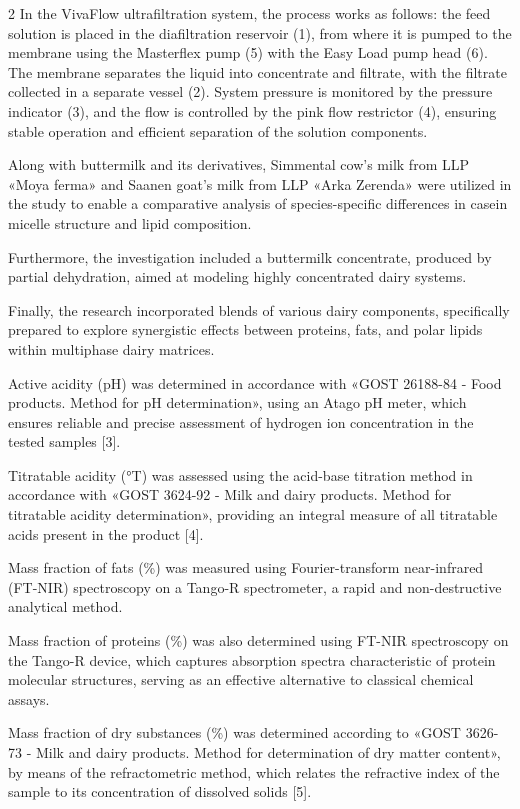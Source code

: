 \begin{multicols}{2}
In the VivaFlow ultrafiltration system, the process works as follows:
the feed solution is placed in the diafiltration reservoir (1), from
where it is pumped to the membrane using the Masterflex pump (5) with
the Easy Load pump head (6). The membrane separates the liquid into
concentrate and filtrate, with the filtrate collected in a separate
vessel (2). System pressure is monitored by the pressure indicator (3),
and the flow is controlled by the pink flow restrictor (4), ensuring
stable operation and efficient separation of the solution components.

Along with buttermilk and its derivatives, Simmental cow's milk from LLP
«Moya ferma» and Saanen goat's milk from LLP «Arka Zerenda» were
utilized in the study to enable a comparative analysis of
species-specific differences in casein micelle structure and lipid
composition.

Furthermore, the investigation included a buttermilk concentrate,
produced by partial dehydration, aimed at modeling highly concentrated
dairy systems.

Finally, the research incorporated blends of various dairy components,
specifically prepared to explore synergistic effects between proteins,
fats, and polar lipids within multiphase dairy matrices.

Active acidity (pH) was determined in accordance with «GOST 26188-84 -
Food products. Method for pH determination», using an Atago pH meter,
which ensures reliable and precise assessment of hydrogen ion
concentration in the tested samples {[}3{]}.

Titratable acidity (°T) was assessed using the acid-base titration
method in accordance with «GOST 3624-92 - Milk and dairy products.
Method for titratable acidity determination», providing an integral
measure of all titratable acids present in the product {[}4{]}.

Mass fraction of fats (\%) was measured using Fourier-transform
near-infrared (FT-NIR) spectroscopy on a Tango-R spectrometer, a rapid
and non-destructive analytical method.

Mass fraction of proteins (\%) was also determined using FT-NIR
spectroscopy on the Tango-R device, which captures absorption spectra
characteristic of protein molecular structures, serving as an effective
alternative to classical chemical assays.

Mass fraction of dry substances (\%) was determined according to «GOST
3626-73 - Milk and dairy products. Method for determination of dry
matter content», by means of the refractometric method, which relates
the refractive index of the sample to its concentration of dissolved
solids {[}5{]}.


\end{multicols}

